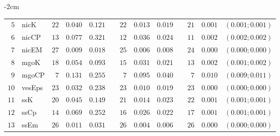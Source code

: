 \begin{table*}[!htbp]
\begin{adjustwidth*}{}{-2cm}
\begin{tabular}{@{}rlrrrrrrrrrcc@{}}
\footnotesize{$5 $} & \footnotesize{nicK     } & \footnotesize{$22$} & \footnotesize{$0.040$} & \footnotesize{$0.121$} && \footnotesize{$22$} & \footnotesize{$0.013$} & \footnotesize{$0.019$} && \footnotesize{$21$} & \footnotesize{$0.001$} & \footnotesize{$(0.001;0.001)$} \\
\footnotesize{$6 $} & \footnotesize{nicCP    } & \footnotesize{$13$} & \footnotesize{$0.077$} & \footnotesize{$0.321$} && \footnotesize{$12$} & \footnotesize{$0.036$} & \footnotesize{$0.024$} && \footnotesize{$11$} & \footnotesize{$0.002$} & \footnotesize{$(0.002;0.002)$} \\
\footnotesize{$7 $} & \footnotesize{nicEM    } & \footnotesize{$27$} & \footnotesize{$0.009$} & \footnotesize{$0.018$} && \footnotesize{$25$} & \footnotesize{$0.006$} & \footnotesize{$0.008$} && \footnotesize{$24$} & \footnotesize{$0.000$} & \footnotesize{$(0.000;0.000)$} \\
\footnotesize{$8 $} & \footnotesize{mgoK     } & \footnotesize{$18$} & \footnotesize{$0.054$} & \footnotesize{$0.093$} && \footnotesize{$15$} & \footnotesize{$0.031$} & \footnotesize{$0.021$} && \footnotesize{$13$} & \footnotesize{$0.002$} & \footnotesize{$(0.001;0.002)$} \\
\footnotesize{$9 $} & \footnotesize{mgoCP    } & \footnotesize{$7 $} & \footnotesize{$0.131$} & \footnotesize{$0.255$} && \footnotesize{$7 $} & \footnotesize{$0.095$} & \footnotesize{$0.040$} && \footnotesize{$7 $} & \footnotesize{$0.010$} & \footnotesize{$(0.009;0.011)$} \\
\footnotesize{$10$} & \footnotesize{vesEps   } & \footnotesize{$23$} & \footnotesize{$0.032$} & \footnotesize{$0.238$} && \footnotesize{$23$} & \footnotesize{$0.010$} & \footnotesize{$0.019$} && \footnotesize{$23$} & \footnotesize{$0.000$} & \footnotesize{$(0.000;0.000)$} \\
\footnotesize{$11$} & \footnotesize{ssK      } & \footnotesize{$20$} & \footnotesize{$0.045$} & \footnotesize{$0.149$} && \footnotesize{$21$} & \footnotesize{$0.014$} & \footnotesize{$0.023$} && \footnotesize{$22$} & \footnotesize{$0.001$} & \footnotesize{$(0.001;0.001)$} \\
\footnotesize{$12$} & \footnotesize{ssCp     } & \footnotesize{$14$} & \footnotesize{$0.069$} & \footnotesize{$0.252$} && \footnotesize{$16$} & \footnotesize{$0.026$} & \footnotesize{$0.022$} && \footnotesize{$17$} & \footnotesize{$0.001$} & \footnotesize{$(0.001;0.001)$} \\
\footnotesize{$13$} & \footnotesize{ssEm     } & \footnotesize{$26$} & \footnotesize{$0.011$} & \footnotesize{$0.031$} && \footnotesize{$26$} & \footnotesize{$0.004$} & \footnotesize{$0.006$} && \footnotesize{$26$} & \footnotesize{$0.000$} & \footnotesize{$(0.000;0.000)$} \\

\end{tabular}
\end{adjustwidth*}
\end{table*}
